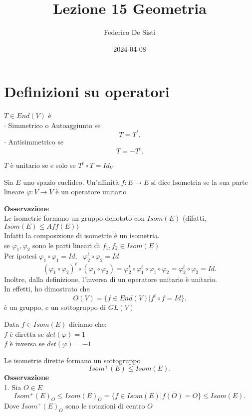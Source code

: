 \documentclass[12px]{article}
\title{Lezione 15 Geometria}
\date{2024-04-08}
\author{Federico De Sisti}
\begin{document}
	\maketitle
	\newpage
	\section{Definizioni su operatori}
	\begin{defi}
		$T\in End(V)$ è \\
		$\cdot$ Simmetrico o Autoaggiunto se
		\[
		T = T^t
		.\] 
		$\cdot$ Antisimmetrico se
		\[
		T = -T^t
		.\] 
	\end{defi}
	\begin{prop}
		$T$ è unitario se e solo se $T^t\circ T = Id_V$
	\end{prop}
	\begin{defi}
		Sia $E$ uno spazio euclideo. Un'affinità $f:E \rightarrow E$ si dice Isometria se la sua parte lineare $\varphi: V \rightarrow V$ è un operatore unitario
	\end{defi}
	\textbf{Osservazione}\\
	Le isometrie formano un gruppo denotato con $Isom(E)$ (difatti, $Isom(E) \leq Aff(E))$\\
	Infatti la composizione di isometrie è un isometria.\\
	se $\varphi_1,\varphi_2$ sono le parti lineari di $f_1,f_2\in Isom(E)$\\
	Per ipotesi $\varphi_1\circ \varphi_1 = Id, \ \ \ \varphi_2^t\circ \varphi_2 = Id$ \\
	\[
		(\varphi_1\circ \varphi_2)^t\circ(\varphi_1\circ \varphi_2) = \varphi_2^t\circ \varphi_1^t\circ \varphi_1\circ \varphi_2 = \varphi_2^t\circ \varphi_2 = Id
	.\] 
	Inoltre, dalla definizione, l'inversa di un operatore unitario è unitario.\\
	In effetti, ho dimostrato che 
	\[
		O(V) = \{f\in End(V)|f^t\circ f = Id\}
	.\] 
	è un gruppo, e un sottogruppo di $GL(V)$\\
 \begin{nome}
 	Data $f\in Isom(E)$ diciamo che:\\
	$f$ è diretta se $det(\varphi) = 1$ \\
	$f$ è inversa se $det(\varphi) = -1$
 \end{nome}
 Le isometrie dirette formano un sottogruppo
 \[
 Isom^+(E)\leq Isom(E)
 .\] 
 \textbf{Osservazione}
\\
1. Sia $O\in E$ 
\[
 Isom^+(E)_O\leq Isom(E)_O = \{f\in Isom(E)|f(O) = O\} \leq Isom(E)
.\] 
Dove $Isom^+(E)_O$ sono le rotazioni di centro $O$ \\
\end{document}
